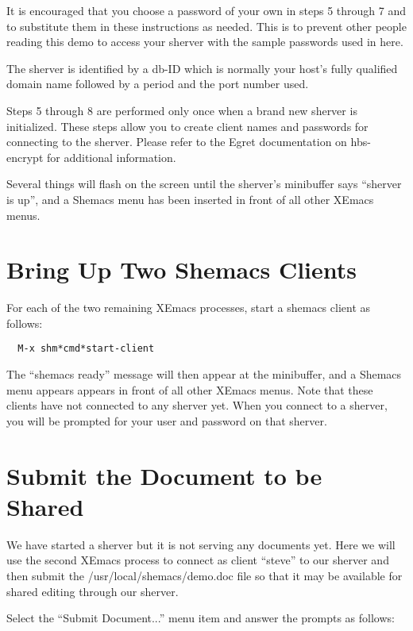 It is encouraged that you choose a password of your own in steps 5 through
7 and to substitute them in these instructions as needed. This is to
prevent other people reading this demo to access your sherver with the
sample passwords used in here.

The sherver is identified by a db-ID which is normally your host's fully
qualified domain name followed by a period and the port number used.

Steps 5 through 8 are performed only once when a brand new sherver is
initialized.  These steps allow you to create client names and passwords
for connecting to the sherver.  Please refer to the Egret documentation on
hbs-encrypt for additional information.

Several things will flash on the screen until the sherver's minibuffer says
``sherver is up'', and a Shemacs menu has been inserted in front of all other
XEmacs menus.

\section{Bring Up Two Shemacs Clients}

For each of the two remaining XEmacs processes, start a shemacs client
as follows:
	
\small\begin{verbatim}
  M-x shm*cmd*start-client
\end{verbatim}\normalsize

The ``shemacs ready'' message will then appear at the minibuffer, and a Shemacs 
menu appears appears in front of all other XEmacs menus.  Note that these 
clients have not connected to any sherver yet.  When you connect to a sherver, 
you will be prompted for your user and password on that sherver.

\section{Submit the Document to be Shared}

We have started a sherver but it is not serving any documents yet.  Here we
will use the second XEmacs process to connect as client ``steve'' to our
sherver and then submit the /usr/local/shemacs/demo.doc file so that it may
be available for shared editing through our sherver.

Select the ``Submit Document...'' menu item and answer the prompts as follows:

